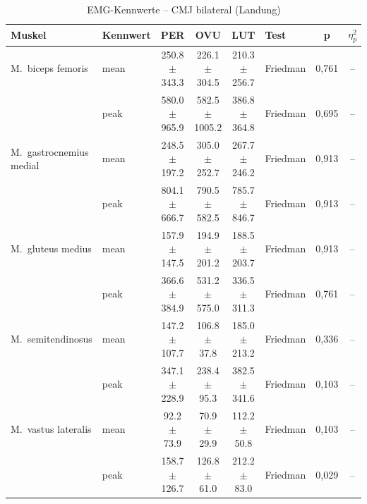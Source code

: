 \begin{table}[H]
  \centering
  \caption{EMG-Kennwerte – CMJ bilateral (Landung)}
  \label{tab:CMJ_bilateral_Landung}
  \small
  \begin{tabular}{l l c c c l c c}
    \hline
    \textbf{Muskel} & \textbf{Kennwert} & \textbf{PER} & \textbf{OVU} & \textbf{LUT} & \textbf{Test} & \textbf{p} & \textbf{$\eta^2_p$} \\
    \hline
    M.~biceps femoris & mean & 250.8 $\pm$ 343.3 & 226.1 $\pm$ 304.5 & 210.3 $\pm$ 256.7 & Friedman & 0{,}761 & -- \\
     & peak & 580.0 $\pm$ 965.9 & 582.5 $\pm$ 1005.2 & 386.8 $\pm$ 364.8 & Friedman & 0{,}695 & -- \\
    \hline
    M.~gastrocnemius medial & mean & 248.5 $\pm$ 197.2 & 305.0 $\pm$ 252.7 & 267.7 $\pm$ 246.2 & Friedman & 0{,}913 & -- \\
     & peak & 804.1 $\pm$ 666.7 & 790.5 $\pm$ 582.5 & 785.7 $\pm$ 846.7 & Friedman & 0{,}913 & -- \\
    \hline
    M.~gluteus medius & mean & 157.9 $\pm$ 147.5 & 194.9 $\pm$ 201.2 & 188.5 $\pm$ 203.7 & Friedman & 0{,}913 & -- \\
     & peak & 366.6 $\pm$ 384.9 & 531.2 $\pm$ 575.0 & 336.5 $\pm$ 311.3 & Friedman & 0{,}761 & -- \\
    \hline
    M.~semitendinosus & mean & 147.2 $\pm$ 107.7 & 106.8 $\pm$ 37.8 & 185.0 $\pm$ 213.2 & Friedman & 0{,}336 & -- \\
     & peak & 347.1 $\pm$ 228.9 & 238.4 $\pm$ 95.3 & 382.5 $\pm$ 341.6 & Friedman & 0{,}103 & -- \\
    \hline
    M.~vastus lateralis & mean & 92.2 $\pm$ 73.9 & 70.9 $\pm$ 29.9 & 112.2 $\pm$ 50.8 & Friedman & 0{,}103 & -- \\
     & peak & 158.7 $\pm$ 126.7 & 126.8 $\pm$ 61.0 & 212.2 $\pm$ 83.0 & Friedman & 0{,}029 & -- \\
    \hline
  \end{tabular}
\end{table}

